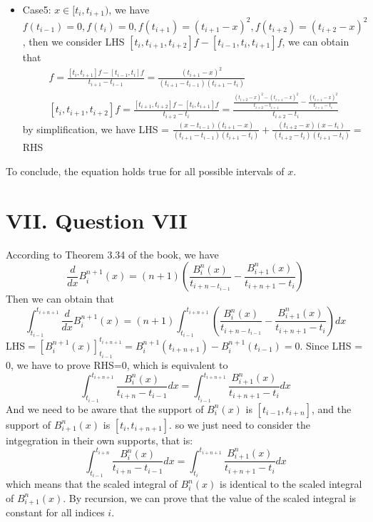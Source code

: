 \documentclass[a4paper]{article}
\begin{document}
\begin{itemize}
\begin{align}
      [t_{i-1},t_{i},t_{i+1}]f = \frac{t_{i+1}+t_i-2x-\frac{(t_i-x)^2}{t_i-t_{i-1}}}{t_{i+1}-t_{i-1}}
    \end{align}
    Thus, by simplification, we can obtain that LHS $=\frac{(x-t_{i-1})^2}{(t_{i+1}-t_{i-1})(t_i-t_{i-1})}= $ RHS
  \item Case5: $x\in[t_i,t_{i+1})$, we have $f(t_{i-1})=0,f(t_i)=0,f(t_{i+1})=(t_{i+1}-x)^2,f(t_{i+2})=(t_{i+2}-x)^2$, then we consider LHS $[t_i,t_{i+1},t_{i+2}]f-[t_{i-1},t_i,t_{i+1}]f$, we can obtain that
  \begin{align}
    [t_{i-1},t_i,t_{i+1}]f=\frac{[t_i,t_{i+1}]f-[t_{i-1},t_i]f}{t_{i+1}-t_{i-1}}=\frac{(t_{i+1}-x)^2}{(t_{i+1}-t_{i-1})(t_{i+1}-t_i)}\\
    [t_i, t_{i+1}, t_{i+2}]f = \frac{[t_{i+1}, t_{i+2}]f - [t_i, t_{i+1}]f}{t_{i+2}-t_i} =\frac{\frac{(t_{i+2}-x)^2 - (t_{i+1}-x)^2}{t_{i+2}-t_{i+1}} - \frac{(t_{i+1}-x)^2}{t_{i+1}-t_i}}{t_{i+2}-t_i}
  \end{align}
  by simplification, we have LHS = $\frac{(x-t_{i-1})(t_{i+1}-x)}{(t_{i+1}-t_{i-1})(t_{i+1}-t_i)} + \frac{(t_{i+2}-x)(x-t_i)}{(t_{i+2}-t_i)(t_{i+1}-t_i)}=$ RHS 
\end{itemize} 

To conclude, the equation holds true for all possible intervals of $x$.


\section*{VII. Question VII}
According to Theorem 3.34 of the book, we have 
\begin{equation}
  \frac{d}{dx}B_i^{n+1}(x)=(n+1)(\frac{B_i^n(x)}{t_{i+n-t_{i-1}}}-\frac{B_{i+1}^n(x)}{t_{i+n+1}-t_i})
\end{equation}
Then we can obtain that 
\begin{equation}
  \int_{t_{i-1}}^{t_{i+n+1}}\frac{d}{dx}B_i^{n+1}(x)=(n+1)\int_{t_{i-1}}^{t_{i+n+1}}(\frac{B_i^n(x)}{t_{i+n-t_{i-1}}}-\frac{B_{i+1}^n(x)}{t_{i+n+1}-t_i})dx
\end{equation}
LHS$=[B_i^{n+1}(x)]_{t_{i-1}}^{t_{i+n+1}}=B_i^{n+1}(t_{i+n+1})-B_i^{n+1}(t_{i-1})=0$. Since LHS = 0, we have to prove RHS=0, which is equivalent to
\begin{equation}
  \int_{t_{i-1}}^{t_{i+n+1}}\frac{B_i^n(x)}{t_{i+n}-t_{i-1}}dx = \int_{t_{i-1}}^{t_{i+n+1}}\frac{B_{i+1}^n(x)}{t_{i+n+1}-t_i}dx
\end{equation}
And we need to be aware that the support of $B_i^n(x)$ is $[t_{i-1},t_{i+n}]$, and the support of $B_{i+1}^n(x)$ is $[t_i,t_{i+n+1}]$. so we just need to consider the intgegration in their own supports, that is:
\begin{equation}
  \int_{t_{i-1}}^{t_{i+n}}\frac{B_i^n(x)}{t_{i+n}-t_{i-1}}dx=\int_{t_i}^{t_{i+n+1}}\frac{B_{i+1}^n(x)}{t_{i+n+1}-t_i}dx
\end{equation}
which means that the scaled integral of $B_i^n(x)$ is identical to the scaled integral of $B_{i+1}^n(x)$. By recursion, we can prove that the value of the scaled integral is constant for all indices $i$.
\end{document}
